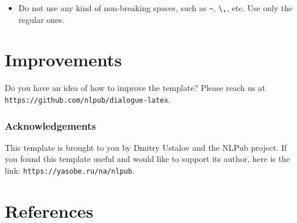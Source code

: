\documentclass{dialogue}
\begin{document}
\begin{itemize}
  \item Do not use any kind of non-breaking spaces, such as \verb|~|, \verb|\,|, etc. Use only the regular ones.
\end{itemize}

\section{Improvements}

Do you have an idea of how to improve the template? Please reach us at\\\texttt{https://github.com/nlpub/dialogue-latex}.

\subsubsection*{Acknowledgements}

This template is brought to you by Dmitry Ustalov and the NLPub project. If you found this template useful and would like to support its author, here is the link: \texttt{https://yasobe.ru/na/nlpub}.

\color{blue}\section*{References}

\makeatletter
\renewcommand{\section}{\@gobbletwo}
\makeatother

\end{document}
